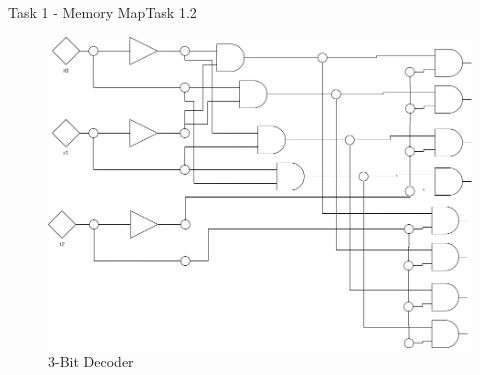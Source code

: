 \begin{frame}{Task 1 - Memory Map}{Task 1.2\vspace{0.25cm}}
  \begin{figure}
    \centering
    \includegraphics[height=0.6\paperheight]{./figures/3BitDecoder.png}
    \caption{3-Bit Decoder}
  \end{figure}
\end{frame}


